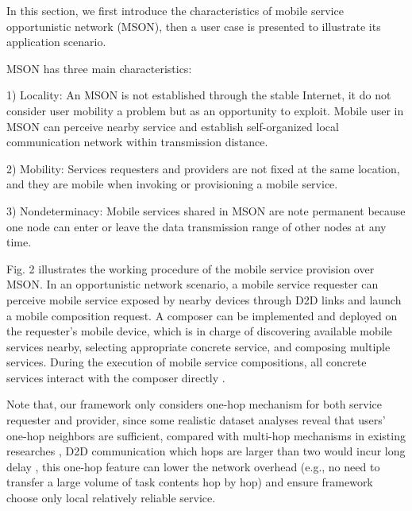 \documentclass[10pt,journal,compsoc]{IEEEtran}
\begin{document}
In this section, we first introduce the characteristics of mobile service opportunistic network (MSON), then a user case is presented to illustrate its application scenario.

MSON has three main characteristics:

1) Locality: An MSON is not established through the stable Internet, it do not consider user mobility a problem but as an opportunity to exploit. Mobile user in MSON can perceive nearby service and establish self-organized local communication network within transmission distance.

2) Mobility: Services requesters and providers are not fixed at the same location, and they are mobile when invoking or provisioning a mobile service.

3) Nondeterminacy: Mobile services shared in MSON are note permanent because one node can enter or leave the data transmission range of other nodes at any time. 

Fig. 2 illustrates the working procedure of the mobile service provision over MSON. In an opportunistic network scenario, a mobile service requester can perceive mobile service exposed by nearby devices through D2D links and launch a mobile composition request. A composer can be implemented and deployed on the requester's mobile device, which is in charge of discovering available mobile services nearby, selecting appropriate concrete service, and composing multiple services. During the execution of mobile service compositions, all concrete services interact with the composer directly \cite{Deng2017}.

Note that, our framework only considers one-hop mechanism for both service requester and provider, since some realistic dataset analyses reveal that users' one-hop neighbors are sufficient, compared with multi-hop mechanisms in existing researches \cite{chang2015progressive,tuncay2013participant,wu2013homing,jiang2016exploiting,liu2013exploring}, D2D communication which hops are larger than two would incur long delay \cite{li2014can},  this one-hop feature can lower the network overhead (e.g., no need to transfer a large volume of task contents hop by hop) and ensure framework choose only local relatively reliable service. 
\end{document}
